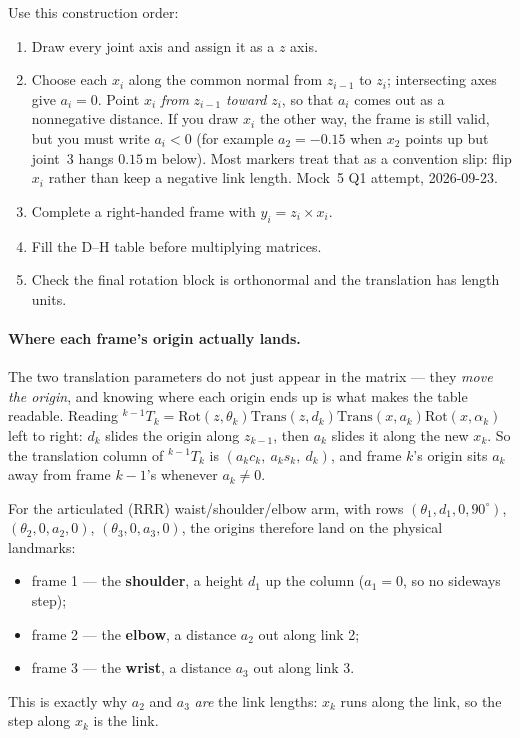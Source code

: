 \documentclass[11pt,a4paper]{article}
\begin{document}
Use this construction order:
\begin{enumerate}
\item Draw every joint axis and assign it as a $z$ axis.
\item Choose each $x_i$ along the common normal from $z_{i-1}$ to $z_i$; intersecting axes give $a_i=0$. Point $x_i$ \emph{from} $z_{i-1}$ \emph{toward} $z_i$, so that $a_i$ comes out as a nonnegative distance. If you draw $x_i$ the other way, the frame is still valid, but you must write $a_i<0$ (for example $a_2=-0.15$ when $x_2$ points up but joint~3 hangs $0.15$\,m below). Most markers treat that as a convention slip: flip $x_i$ rather than keep a negative link length. Mock~5 Q1 attempt, 2026-09-23.
\item Complete a right-handed frame with $y_i=z_i\times x_i$.
\item Fill the D--H table before multiplying matrices.
\item Check the final rotation block is orthonormal and the translation has length units.
\end{enumerate}

\paragraph{Where each frame's origin actually lands.}
The two translation parameters do not just appear in the matrix --- they \emph{move the origin}, and
knowing where each origin ends up is what makes the table readable. Reading
${}^{k-1}T_k=\mathrm{Rot}(z,\theta_k)\mathrm{Trans}(z,d_k)\mathrm{Trans}(x,a_k)\mathrm{Rot}(x,\alpha_k)$
left to right: $d_k$ slides the origin along $z_{k-1}$, then $a_k$ slides it along the new $x_k$. So
the translation column of ${}^{k-1}T_k$ is $(a_kc_k,\ a_ks_k,\ d_k)$, and frame $k$'s origin sits
$a_k$ away from frame $k-1$'s whenever $a_k\neq0$.

For the articulated (RRR) waist/shoulder/elbow arm, with rows
$(\theta_1,d_1,0,90^\circ)$, $(\theta_2,0,a_2,0)$, $(\theta_3,0,a_3,0)$, the origins therefore land
on the physical landmarks:
\begin{itemize}
\item frame 1 --- the \textbf{shoulder}, a height $d_1$ up the column ($a_1=0$, so no sideways step);
\item frame 2 --- the \textbf{elbow}, a distance $a_2$ out along link 2;
\item frame 3 --- the \textbf{wrist}, a distance $a_3$ out along link 3.
\end{itemize}
This is exactly why $a_2$ and $a_3$ \emph{are} the link lengths: $x_k$ runs along the link, so the
step along $x_k$ is the link.
\end{document}
